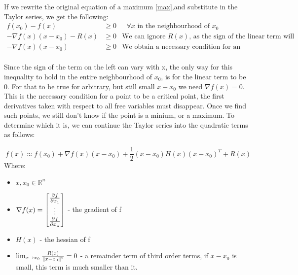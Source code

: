 If we rewrite the original equation of a maximum \ref{max},and substitute in
the Taylor series, we get the following:
\begin{equation}
    \begin{aligned}
        f(x_0) - f(x)&\ge 0 &\mbox{   $\forall x$ in the neighbourhood of $x_0$}\\[1.25ex]
        -\nabla f(x) (x-x_0) - R(x)&\ge 0&\mbox{We can ignore $R(x)$, as the sign of the linear term will dominate}\\[1.25ex]
        -\nabla f(x) (x-x_0) &\ge 0&\mbox{We obtain a necessary condition for an extremum}\\[1.25ex]
    \end{aligned}
\end{equation}

Since the sign of the term on the left can vary with x, the only way for this inequality to hold in the entire neighbourhood of $x_0$, is for the linear term to be 0. For that to be true for arbitrary, but still small $x-x_0$ we need $\nabla f(x) = 0$.\\
This is the necessary condition for a point to be a critical point, the first derivatives taken with respect to all free variables must disappear.
Once we find such points, we still don't know if the point is a minium, or a maximum. To determine which it is, we can continue the Taylor series into the quadratic terms as follows:

\begin{equation}
    f(x) \approx f(x_0) + \nabla f(x)(x-x_0) + \frac{1}{2}(x-x_0)H(x)(x-x_0)^{T} + R(x)
\end{equation}
Where:
\begin{itemize}
        \item $x,x_0 \in  \mathbb{R}^{n}$ 
        \item $\nabla f(x) = \begin{bmatrix}
                \pdv{f}{x_1}\\ \vdots \\ \pdv{f}{x_n}

        \end{bmatrix}$ - the gradient of f
    \item $H(x)$ - the hessian of f
    \item $\lim_{x \rightarrow x_0}\frac{R(x)}{\norm{x-x_0}^{2}} = 0$ - a remainder term of third order terms, if $x - x_0$ is small, this term is much smaller than it.
\end{itemize}

